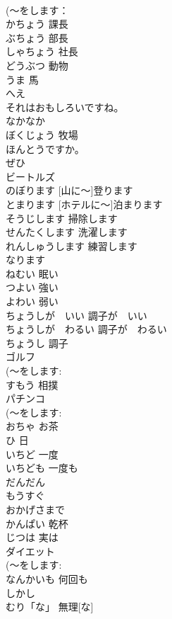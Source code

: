 \documentclass[8pt]{extreport}
\begin{document}
\begin{CJK}{UTF8}{min}
\\	(～をします：
\\	かちょう	課長	
\\	ぶちょう	部長	
\\	しゃちょう	社長	
\\	どうぶつ	動物	
\\	うま	馬	
\\	へえ			
\\	それはおもしろいですね。			
\\	なかなか			
\\	ぼくじょう	牧場	
\\	ほんとうですか。			
\\	ぜひ			
\\	ビートルズ			
\\	[やまに～]のぼります	[山に～]登ります	
\\	[ホテルに～]とまります	[ホテルに～]泊まります	
\\	そうじします	掃除します	
\\	せんたくします	洗濯します	
\\	れんしゅうします	練習します	
\\	なります			
\\	ねむい	眠い	
\\	つよい	強い	
\\	よわい	弱い	
\\	ちょうしが　いい	調子が　いい	
\\	ちょうしが　わるい	調子が　わるい	
\\	ちょうし	調子	
\\	ゴルフ			
\\	(～をします:
\\	すもう	相撲	
\\	パチンコ			
\\	(～をします: 
\\	おちゃ	お茶	
\\	ひ	日	
\\	いちど	一度	
\\	いちども	一度も	
\\	だんだん			
\\	もうすぐ			
\\	おかげさまで			
\\	かんぱい	乾杯	
\\	じつは	実は	
\\	ダイエット			
\\	(～をします:
\\	なんかいも	何回も	
\\	しかし			
\\	むり「な」	無理[な]	

\end{CJK}
\end{document}
